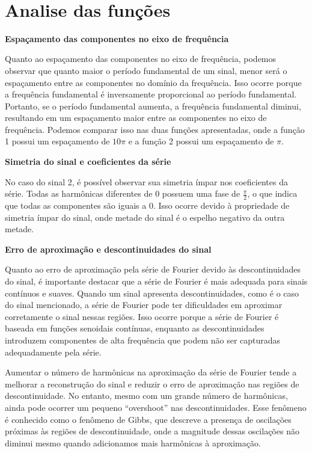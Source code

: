\documentclass{article}
\begin{document}
    \begin{center}
    \end{center}
    { \hspace*{\fill} \\}
    
    \hypertarget{analise-das-funuxe7uxf5es}{%
\section{Analise das funções}\label{analise-das-funuxe7uxf5es}}

\textbf{Espaçamento das componentes no eixo de frequência}

Quanto ao espaçamento das componentes no eixo de frequência, podemos
observar que quanto maior o período fundamental de um sinal, menor será
o espaçamento entre as componentes no domínio da frequência. Isso ocorre
porque a frequência fundamental é inversamente proporcional ao período
fundamental. Portanto, se o período fundamental aumenta, a frequência
fundamental diminui, resultando em um espaçamento maior entre as
componentes no eixo de frequência. Podemos comparar isso nas duas
funções apresentadas, onde a função 1 possui um espaçamento de \(10\pi\)
e a função 2 possui um espaçamento de \(\pi\). 

\textbf{Simetria do sinal
e coeficientes da série}

No caso do sinal 2, é possível observar sua simetria ímpar nos
coeficientes da série. Todas as harmônicas diferentes de 0 possuem uma
fase de \(\frac{\pi}{2}\), o que indica que todas as componentes são
iguais a 0. Isso ocorre devido à propriedade de simetria ímpar do sinal,
onde metade do sinal é o espelho negativo da outra metade. 

\textbf{Erro
de aproximação e descontinuidades do sinal}

Quanto ao erro de aproximação pela série de Fourier devido às
descontinuidades do sinal, é importante destacar que a série de Fourier
é mais adequada para sinais contínuos e suaves. Quando um sinal
apresenta descontinuidades, como é o caso do sinal mencionado, a série
de Fourier pode ter dificuldades em aproximar corretamente o sinal
nessas regiões. Isso ocorre porque a série de Fourier é baseada em
funções senoidais contínuas, enquanto as descontinuidades introduzem
componentes de alta frequência que podem não ser capturadas
adequadamente pela série.

Aumentar o número de harmônicas na aproximação da série de Fourier tende
a melhorar a reconstrução do sinal e reduzir o erro de aproximação nas
regiões de descontinuidade. No entanto, mesmo com um grande número de
harmônicas, ainda pode ocorrer um pequeno ``overshoot'' nas
descontinuidades. Esse fenômeno é conhecido como o fenômeno de Gibbs,
que descreve a presença de oscilações próximas às regiões de
descontinuidade, onde a magnitude dessas oscilações não diminui mesmo
quando adicionamos mais harmônicas à aproximação.


    
    
    
\end{document}
